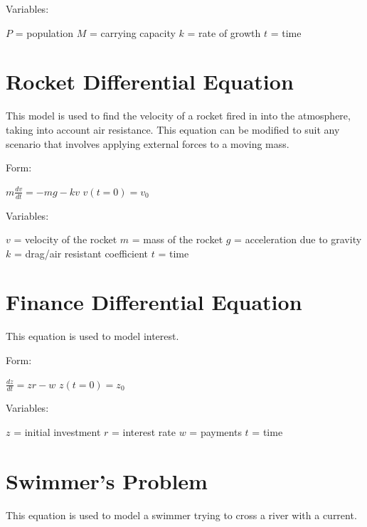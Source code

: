 \documentclass[12 pt, oneside]{book}
\begin{document}
Variables:
\begin{mathline}
  $P$ = population\newline{}
  $M$ = carrying capacity\newline{}
  $k$ = rate of growth\newline{}
  $t$ = time
\end{mathline}

\section{Rocket Differential Equation}
This model is used to find the velocity of a rocket fired in into the atmosphere, taking into account air resistance. This equation can be modified to suit any scenario that involves applying external forces to a moving mass.

Form:
\begin{mathline}
  $m\frac{dv}{dt}=-mg-kv$\newline{}
  $v(t=0)=v_0$
\end{mathline}

Variables:
\begin{mathline}
  $v$ = velocity of the rocket \newline{}
  $m$ = mass of the rocket\newline{}
  $g$ = acceleration due to gravity\newline{}
  $k$ = drag/air resistant coefficient\newline{}
  $t$ = time
\end{mathline}
  
\section{Finance Differential Equation}
This equation is used to model interest.

Form:
\begin{mathline}
  $\frac{dz}{dt} = zr-w$\newline{}
  $z(t=0)=z_0$
\end{mathline}

Variables:
\begin{mathline}
  $z$ = initial investment\newline{}
  $r$ = interest rate\newline{}
  $w$ = payments\newline{}
  $t$ = time
\end{mathline}

\section{Swimmer's Problem}
This equation is used to model a swimmer trying to cross a river with a current.
\end{document}
